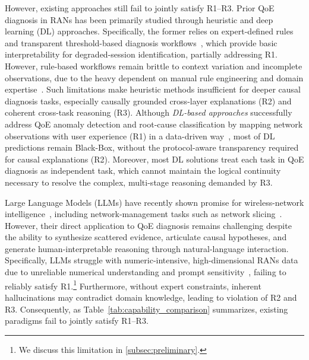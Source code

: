 \documentclass[sigconf,10pt]{acmart} %
\begin{document}
However, existing approaches still fail to jointly satisfy R1--R3.
Prior QoE diagnosis in RANs has been primarily studied through heuristic and deep learning (DL) approaches. Specifically, the former relies on expert-defined rules and transparent threshold-based diagnosis workflows~\cite{ciocarlie2014feasibility, moulay2020novel, yuan2020anomaly}, which provide basic interpretability for degraded-session identification, partially addressing R1. However, rule-based workflows remain brittle to context variation and incomplete observations, due to the heavy dependent on manual rule engineering and domain expertise~\citep{yuan2020anomaly}. Such limitations make heuristic methods insufficient for deeper causal diagnosis tasks, especially causally grounded cross-layer explanations (R2) and coherent cross-task reasoning (R3). 
Although \textit{DL-based approaches} successfully address QoE anomaly detection and root-cause classification by mapping network observations with user experience (R1) in a data-driven way~\cite{chawla2020interpretable, sun2024spotlight, li2025dk, ghuge2023deep}, most of DL predictions remain Black-Box, without the protocol-aware transparency required for causal explanations (R2). Moreover, most DL solutions treat each task in QoE diagnosis as independent task, which cannot maintain the logical continuity necessary to resolve the complex, multi-stage reasoning demanded by R3.


Large Language Models (LLMs) have recently shown promise for wireless-network intelligence~\cite{liu2025deepseek, yang2025qwen3, shen2025autoiot, wang2025large, chen2025first}, including network-management tasks such as network slicing~\cite{tong2025wirelessagent, tong2026wirelessagent}. 
However, their direct application to QoE diagnosis remains challenging despite the ability to synthesize scattered evidence, articulate causal hypotheses, and generate human-interpretable reasoning through natural-language interaction. Specifically, LLMs struggle with numeric-intensive, high-dimensional RANs data due to unreliable numerical understanding and prompt sensitivity~\cite{zhou2025can, park2025revisiting}, failing to reliably satisfy R1.\footnote{We discuss this limitation in \ref{subsec:preliminary}.}
Furthermore, without expert constraints, inherent hallucinations may contradict domain knowledge\cite{lee2025verisafe, chen2026overview}, leading to violation of R2 and R3. Consequently, as Table~\ref{tab:capability_comparison} summarizes, existing paradigms fail to jointly satisfy R1--R3.
\end{document}
